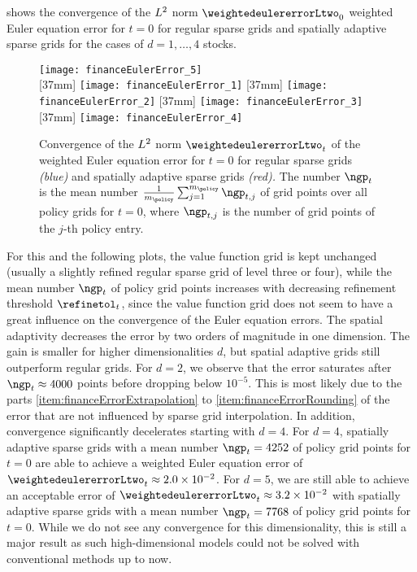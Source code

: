  shows the convergence of the
$L^2$ norm $\weightedeulererrorLtwo_0$
weighted Euler equation error for $t = 0$ for regular sparse grids
and spatially adaptive sparse grids
for the cases of $d = 1, \dotsc, 4$ stocks.
\begin{figure}
  \texttt{[image: financeEulerError\_5]}%
  \\[2mm]%
  [37mm]{%
    \texttt{[image: financeEulerError\_1]}%
  }%
  \hfill%
  [37mm]{%
    \texttt{[image: financeEulerError\_2]}%
  }%
  \hfill%
  [37mm]{%
    \texttt{[image: financeEulerError\_3]}%
  }%
  \hfill%
  [37mm]{%
    \texttt{[image: financeEulerError\_4]}%
  }%
  \caption[Convergence of the weighted Euler equation error]{%
    Convergence of the $L^2$ norm $\weightedeulererrorLtwo_t$
    of the weighted Euler equation error for $t = 0$ for
    regular sparse grids \emph{\textcolor{C0}{(blue)}} and
    spatially adaptive sparse grids \emph{\textcolor{C1}{(red)}.}
    The number $\ngp_t$ is the mean number
    $\frac{1}{m_{\policy}} \sum_{j=1}^{m_{\policy}} \ngp_{t,j}$
    of grid points over all policy grids for $t = 0$,
    where $\ngp_{t,j}$ is the number of grid points
    of the $j$-th policy entry.%
  }%
  \label{fig:financeEulerError}%
\end{figure}%
For this and the following plots,
the value function grid is kept unchanged
(usually a slightly refined regular sparse grid of level three or four),
while the mean number $\ngp_t$ of policy grid points increases
with decreasing refinement threshold $\refinetol_t$,
since the value function grid does not seem to have a great influence
on the convergence of the Euler equation errors.
The spatial adaptivity decreases the error by
two orders of magnitude in one dimension.
The gain is smaller for higher dimensionalities $d$,
but spatial adaptive grids still outperform regular grids.
For $d = 2$, we observe that the error saturates
after $\ngp_t \approx \num{4000}$ points before dropping below $10^{-5}$.
This is most likely due to the parts
\ref{item:financeErrorExtrapolation} to
\ref{item:financeErrorRounding} of the error that are not influenced
by sparse grid interpolation.
In addition, convergence significantly decelerates starting with $d = 4$.
For $d = 4$, spatially adaptive sparse grids with
a mean number $\ngp_t = \num{4252}$ of policy grid points for $t = 0$
are able to achieve a weighted Euler equation error of
$\weightedeulererrorLtwo_t \approx \num{2.0e-2}$.
For $d = 5$, we are still able to achieve an acceptable error of
$\weightedeulererrorLtwo_t \approx \num{3.2e-2}$
with spatially adaptive sparse grids with
a mean number $\ngp_t = \num{7768}$ of policy grid points for $t = 0$.
While we do not see any convergence for this dimensionality,
this is still a major result as such high-dimensional models
could not be solved with conventional methods up to now.

